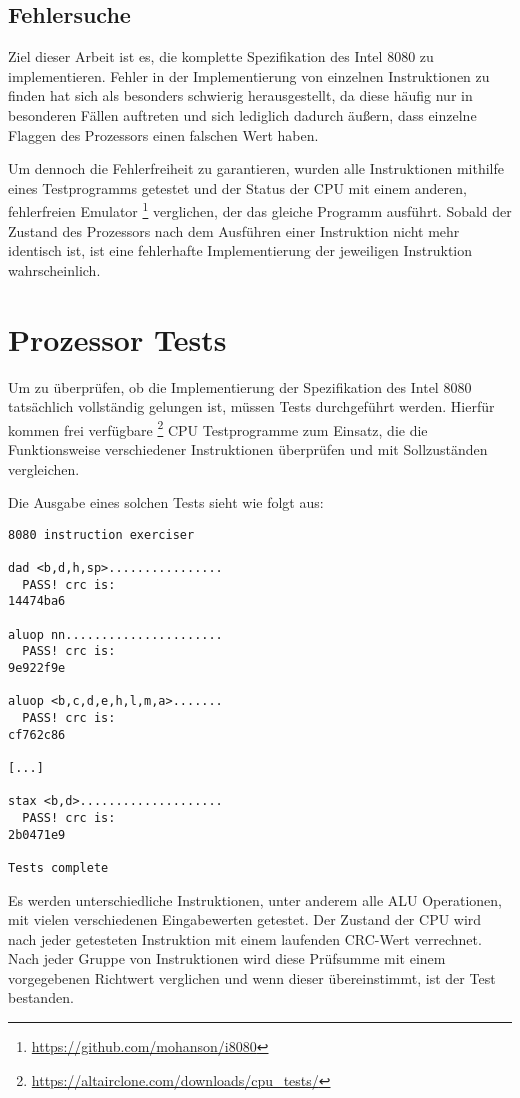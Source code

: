 \subsection{Fehlersuche}\label{sec:errors}

Ziel dieser Arbeit ist es, die komplette Spezifikation des Intel 8080 zu implementieren. Fehler in der Implementierung von einzelnen Instruktionen zu finden hat sich als besonders schwierig herausgestellt, da diese häufig nur in besonderen Fällen auftreten und sich lediglich dadurch äußern, dass einzelne Flaggen des Prozessors einen falschen Wert haben.

Um dennoch die Fehlerfreiheit zu garantieren, wurden alle Instruktionen mithilfe eines Testprogramms getestet und der Status der \ac{CPU} mit einem anderen, fehlerfreien Emulator \footnote[2]{\url{https://github.com/mohanson/i8080}} verglichen, der das gleiche Programm ausführt.
Sobald der Zustand des Prozessors nach dem Ausführen einer Instruktion nicht mehr identisch ist, ist eine fehlerhafte Implementierung der jeweiligen Instruktion wahrscheinlich.

\section{Prozessor Tests}\label{sec:tests}

 Um zu überprüfen, ob die Implementierung der Spezifikation des Intel 8080  tatsächlich vollständig gelungen ist, müssen Tests durchgeführt werden. Hierfür kommen frei verfügbare \footnote[1]{\url{https://altairclone.com/downloads/cpu_tests/}} CPU Testprogramme zum Einsatz, die die Funktionsweise verschiedener Instruktionen überprüfen und mit Sollzuständen vergleichen.

Die Ausgabe eines solchen Tests sieht wie folgt aus:

\begin{verbatim}
8080 instruction exerciser

dad <b,d,h,sp>................
  PASS! crc is:
14474ba6

aluop nn......................
  PASS! crc is:
9e922f9e

aluop <b,c,d,e,h,l,m,a>.......
  PASS! crc is:
cf762c86

[...]

stax <b,d>....................
  PASS! crc is:
2b0471e9

Tests complete
\end{verbatim}

Es werden unterschiedliche Instruktionen, unter anderem alle \ac{ALU} Operationen, mit vielen verschiedenen Eingabewerten getestet. Der Zustand der \ac{CPU} wird nach jeder getesteten Instruktion mit einem laufenden \ac{CRC}-Wert verrechnet. Nach jeder Gruppe von Instruktionen wird diese Prüfsumme mit einem vorgegebenen Richtwert verglichen und wenn dieser übereinstimmt, ist der Test bestanden.

